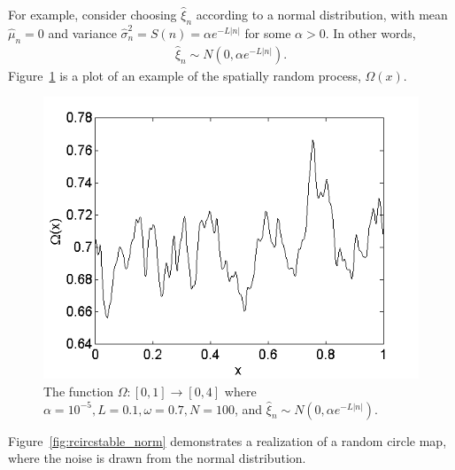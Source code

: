 For example, consider choosing $\hat{\xi}_n$ according to a normal
distribution, with mean $\hat{\mu}_n=0$ and variance $\hat{\sigma}_n^2 =
S(n) = \alpha e^{-L|n|}$ for some $\alpha > 0$. In other words, 
\begin{align}\label{eq:norm}
\hat{\xi}_n\sim N(0,\alpha e^{-L|n|}). 
\end{align}
Figure~\ref{fig:Omega} is a plot of an example of the spatially random process,
$\Omega(x)$.
\begin{figure}[htp]
\caption[The function $\Omega(x)$]{The function $\Omega:[0,1]\to [0,4]$ where
  $\alpha=10^{-5}, L=0.1, \omega=0.7, N=100$, and $\hat{\xi}_n \sim N(0,\alpha e^{-L|n|})$.
  }\label{fig:Omega}
\centering
\includegraphics[scale=0.65]{figs/Omega.png}
\end{figure}
Figure~\ref{fig:rcircstable_norm} demonstrates a realization of a random circle
map, where the noise is drawn from the normal distribution.

